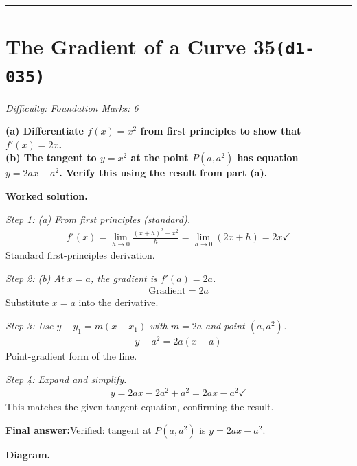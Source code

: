\documentclass[11pt]{article}
\newcommand{\question}[1]{\par\medskip\noindent\textbf{#1}\par}
\begin{document}
\medskip\hrule

\section*{The Gradient of a Curve 35\quad\small\texttt{(d1-035)}}
\textit{Difficulty: Foundation \quad\textbar\quad Marks: 6}

\question{(a) Differentiate \( f(x) = x^2 \) from first principles to show that \( f'(x) = 2x \).\\[3pt]  (b) The tangent to \( y = x^2 \) at the point \( P(a, a^2) \) has equation \( y = 2ax - a^2 \). Verify this using the result from part (a).}

\textbf{Worked solution.}

\textit{Step 1: (a) From first principles (standard).}
\[\begin{gathered}
f'(x) = \lim_{h\to 0}\frac{(x+h)^2 - x^2}{h} = \lim_{h\to 0}(2x+h) = 2x \checkmark
\end{gathered}\]
Standard first-principles derivation.

\textit{Step 2: (b) At \( x = a \), the gradient is \( f'(a) = 2a \).}
\[\begin{gathered}
\text{Gradient} = 2a
\end{gathered}\]
Substitute \( x = a \) into the derivative.

\textit{Step 3: Use \( y - y_1 = m(x - x_1) \) with \( m = 2a \) and point \( (a, a^2) \).}
\[\begin{gathered}
y - a^2 = 2a(x - a)
\end{gathered}\]
Point-gradient form of the line.

\textit{Step 4: Expand and simplify.}
\[\begin{gathered}
y = 2ax - 2a^2 + a^2 = 2ax - a^2 \checkmark
\end{gathered}\]
This matches the given tangent equation, confirming the result.

\begin{answerbox}
\textbf{Final answer:}\quad Verified: tangent at \(\displaystyle  P(a, a^2) \) is \(\displaystyle  y = 2ax - a^2 \).
\end{answerbox}
\textbf{Diagram.}
\end{document}
